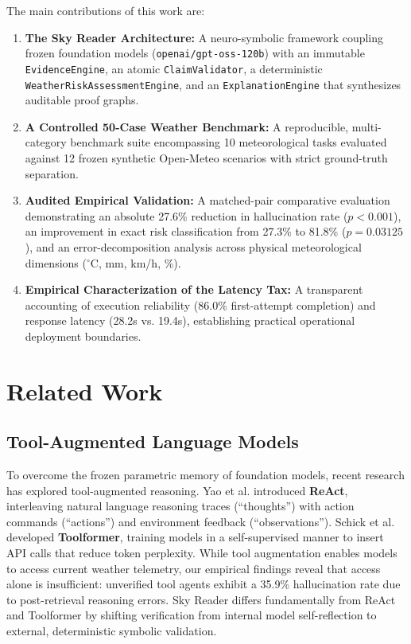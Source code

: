 \documentclass[conference]{IEEEtran}
\begin{document}
The main contributions of this work are:
\begin{enumerate}
    \item \textbf{The Sky Reader Architecture:} A neuro-symbolic framework coupling frozen foundation models (\texttt{openai/gpt-oss-120b}) with an immutable \texttt{EvidenceEngine}, an atomic \texttt{ClaimValidator}, a deterministic \texttt{WeatherRiskAssessmentEngine}, and an \texttt{ExplanationEngine} that synthesizes auditable proof graphs.
    \item \textbf{A Controlled 50-Case Weather Benchmark:} A reproducible, multi-category benchmark suite encompassing 10 meteorological tasks evaluated against 12 frozen synthetic Open-Meteo scenarios with strict ground-truth separation.
    \item \textbf{Audited Empirical Validation:} A matched-pair comparative evaluation demonstrating an absolute 27.6\% reduction in hallucination rate ($p < 0.001$), an improvement in exact risk classification from 27.3\% to 81.8\% ($p = 0.03125$), and an error-decomposition analysis across physical meteorological dimensions ($^\circ$C, mm, km/h, \%).
    \item \textbf{Empirical Characterization of the Latency Tax:} A transparent accounting of execution reliability (86.0\% first-attempt completion) and response latency (28.2s vs. 19.4s), establishing practical operational deployment boundaries.
\end{enumerate}

\section{Related Work}

\subsection{Tool-Augmented Language Models}
To overcome the frozen parametric memory of foundation models, recent research has explored tool-augmented reasoning. Yao et al. \cite{yao2023react} introduced \textbf{ReAct}, interleaving natural language reasoning traces (``thoughts'') with action commands (``actions'') and environment feedback (``observations''). Schick et al. \cite{schick2023toolformer} developed \textbf{Toolformer}, training models in a self-supervised manner to insert API calls that reduce token perplexity. While tool augmentation enables models to access current weather telemetry, our empirical findings reveal that access alone is insufficient: unverified tool agents exhibit a 35.9\% hallucination rate due to post-retrieval reasoning errors. Sky Reader differs fundamentally from ReAct and Toolformer by shifting verification from internal model self-reflection to external, deterministic symbolic validation.
\end{document}

